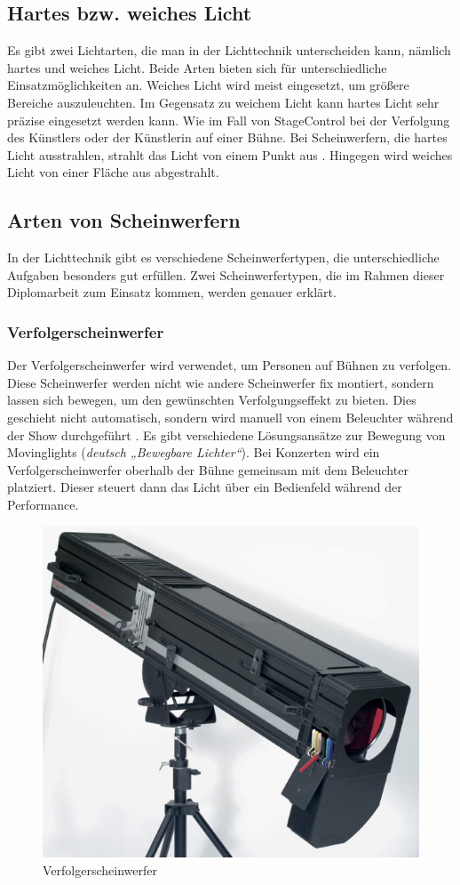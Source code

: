 \subsection{Hartes bzw. weiches Licht}
Es gibt zwei Lichtarten, die man in der Lichttechnik unterscheiden kann, nämlich hartes und weiches Licht. Beide Arten bieten sich für unterschiedliche Einsatzmöglichkeiten an. Weiches Licht wird meist eingesetzt, um größere Bereiche auszuleuchten. Im Gegensatz zu weichem Licht kann hartes Licht sehr präzise eingesetzt werden kann. Wie im Fall von StageControl bei der Verfolgung des Künstlers oder der Künstlerin auf einer Bühne. Bei Scheinwerfern, die hartes Licht ausstrahlen, strahlt das Licht von einem Punkt aus \parencite{HartesWeichesLicht}. Hingegen wird weiches Licht von einer Fläche aus abgestrahlt.\\


\subsection{Arten von Scheinwerfern}
In der Lichttechnik gibt es verschiedene Scheinwerfertypen, die unterschiedliche Aufgaben besonders gut erfüllen. Zwei Scheinwerfertypen, die im Rahmen dieser Diplomarbeit zum Einsatz kommen, werden genauer erklärt.

\newpage
\subsubsection{Verfolgerscheinwerfer}
Der Verfolgerscheinwerfer wird verwendet, um Personen auf Bühnen zu verfolgen. Diese Scheinwerfer werden nicht wie andere Scheinwerfer fix montiert, sondern lassen sich bewegen, um den gewünschten Verfolgungseffekt zu bieten. Dies geschieht nicht automatisch, sondern wird manuell von einem Beleuchter während der Show durchgeführt \parencite{Verfolgerscheinwerfer}. Es gibt verschiedene Lösungsansätze zur Bewegung von Movinglights (\textit{deutsch „Bewegbare Lichter“}).  Bei Konzerten wird ein Verfolgerscheinwerfer oberhalb der Bühne gemeinsam mit dem Beleuchter platziert. Dieser steuert dann das Licht über ein Bedienfeld während der Performance.\\


\begin{figure}[H]
	\centering
	\includegraphics[width=0.4\linewidth]{images/Verfolgerscheinwerfer.jpg}
	\caption[Verfolgerscheinwerfer]{Verfolgerscheinwerfer}
	\label{fig:Verfolgerscheinwerfer}
\end{figure}

